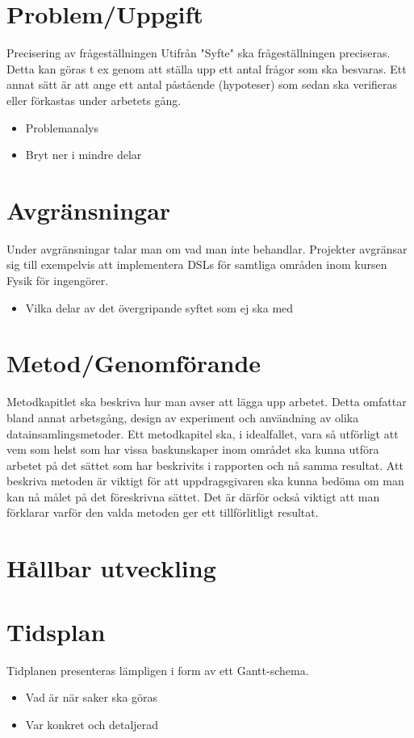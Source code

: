 \documentclass[12pt,a4paper]{article}
\begin{document}
\section{Problem/Uppgift}

Precisering av frågeställningen Utifrån "Syfte" ska frågeställningen preciseras.
Detta kan göras t ex genom att ställa upp ett antal frågor som ska besvaras. Ett
annat sätt är att ange ett antal påstående (hypoteser) som sedan ska verifieras eller
förkastas under arbetets gång.

\begin{itemize}
    \item Problemanalys
    \item Bryt ner i mindre delar
\end{itemize}

\section{Avgränsningar}

Under avgränsningar talar man om vad man inte behandlar.
Projekter avgränsar sig till exempelvis att implementera DSLs för samtliga områden
inom kursen Fysik för ingengörer.

\begin{itemize}
    \item Vilka delar av det övergripande syftet som ej ska med
\end{itemize}

\section{Metod/Genomförande}

Metodkapitlet ska beskriva hur man avser att lägga upp arbetet. Detta
omfattar bland annat arbetsgång, design av experiment och användning av olika
datainsamlingsmetoder. Ett metodkapitel ska, i idealfallet, vara så utförligt att
vem som helst som har vissa baskunskaper inom området ska kunna utföra arbetet
på det sättet som har beskrivits i rapporten och nå samma resultat. Att beskriva
metoden är viktigt för att uppdragsgivaren ska kunna bedöma om man kan nå målet
på det föreskrivna sättet. Det är därför också viktigt att man förklarar varför den
valda metoden ger ett tillförlitligt resultat.

\section{Hållbar utveckling}

\section{Tidsplan}

Tidplanen presenteras lämpligen i form av ett Gantt-schema.

\begin{itemize}
    \item Vad är när saker ska göras
    \item Var konkret och detaljerad
\end{itemize}
\end{document}
